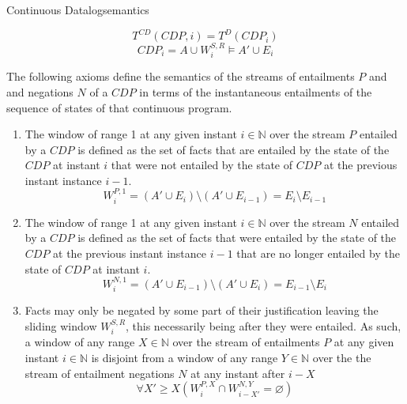 \begin{nestedsection}{Continuous Datalog}{semantics}
\begin{description}
\begin{equation*}
				T^{CD} \left( CDP, i \right) = T^{D} \left( CDP_{i} \right)
			\end{equation*}
			\begin{equation*}
				CDP_{i} = A \cup W^{S,R}_{i} \vDash A' \cup E_{i}
			\end{equation*}
	\end{description}
	The following axioms define the semantics of the streams of entailments $P$ and and negations $N$ of a ${CDP}$ in terms of the instantaneous entailments of the sequence of states of that continuous program.
	\begin{enumerate}\setcounter{enumi}{\thecontinuousDatalogAxioms}
		\item\label{axiom:continuous datalog: positive window increment}
			The window of range 1 at any given instant ${i \in \mathbb{N}}$ over the stream $P$ entailed by a ${CDP}$ is defined as the set of facts that are entailed by the state of the ${CDP}$ at instant $i$ that were not entailed by the state of ${CDP}$ at the previous instant instance ${i-1}$.
			\begin{equation*}
				W^{P,1}_{i} = \left( A' \cup E_{i} \right) \setminus \left( A' \cup E_{i-1} \right) = E_{i} \setminus E_{i-1}
			\end{equation*}
		\item\label{axiom:continuous datalog: negative window increment}
			The window of range 1 at any given instant ${i \in \mathbb{N}}$ over the stream $N$ entailed by a ${CDP}$ is defined as the set of facts that were entailed by the state of the ${CDP}$ at the previous instant instance ${i-1}$ that are no longer entailed by the state of ${CDP}$ at instant $i$.
			\begin{equation*}
				W^{N,1}_{i} = \left( A' \cup E_{i-1} \right) \setminus \left( A' \cup E_{i} \right) = E_{i-1} \setminus E_{i}
			\end{equation*}
		\item\label{axiom:continuous datalog: entailment precedes negation}
			Facts may only be negated by some part of their justification leaving the sliding window $W^{S,R}_{i}$, this necessarily being after they were entailed.
			As such, a window of any range ${X \in \mathbb{N}}$ over the stream of entailments $P$ at any given instant ${i \in \mathbb{N}}$ is disjoint from a window of any range ${Y \in \mathbb{N}}$ over the the stream of entailment negations $N$ at any instant after ${i - X}$
			\begin{equation*}
				\forall X' \geq X \left( W^{P,X}_{i} \cap W^{N,Y}_{i-X'} = \varnothing \right)
			\end{equation*}
		\setcounter{continuousDatalogAxioms}{\theenumi}
	\end{enumerate}


\end{nestedsection}
